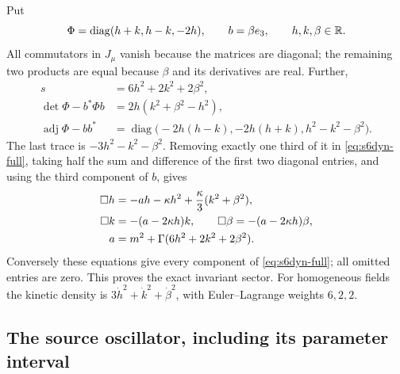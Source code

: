 Put
\begin{equation}\label{eq:s6dyn-sector}
 \Phi=\operatorname{diag}(h+k,h-k,-2h),\qquad b=\beta e_3,
 \qquad h,k,\beta\in\mathbb R.
\end{equation}
All commutators in $J_\mu$ vanish because the matrices are diagonal;
the remaining two products are equal because $\beta$ and its derivatives
are real. Further,
\begin{align*}
 s&=6h^2+2k^2+2\beta^2,\\
 \det\Phi-b^*\Phi b&=2h(k^2+\beta^2-h^2),\\
 \operatorname{adj}\Phi-bb^*
 &=\operatorname{diag}\bigl(-2h(h-k),-2h(h+k),h^2-k^2-\beta^2\bigr).
\end{align*}
The last trace is $-3h^2-k^2-\beta^2$. Removing exactly one third of it
in \eqref{eq:s6dyn-full}, taking half the sum and difference of the first
two diagonal entries, and using the third component of $b$, gives
\begin{align}
 \Box h&=-ah-\kappa h^2+\frac{\kappa}{3}(k^2+\beta^2),\notag\\
 \Box k&=-(a-2\kappa h)k,\qquad
 \Box\beta=-(a-2\kappa h)\beta,\notag\\
 a&=m^2+\Gamma(6h^2+2k^2+2\beta^2).
 \label{eq:s6dyn-three}
\end{align}
Conversely these equations give every component of
\eqref{eq:s6dyn-full}; all omitted entries are zero. This proves the exact
invariant sector. For homogeneous fields the kinetic density is
$3\dot h^2+\dot k^2+\dot\beta^2$, with Euler--Lagrange weights $6,2,2$.

\subsection{The source oscillator, including its parameter interval}

